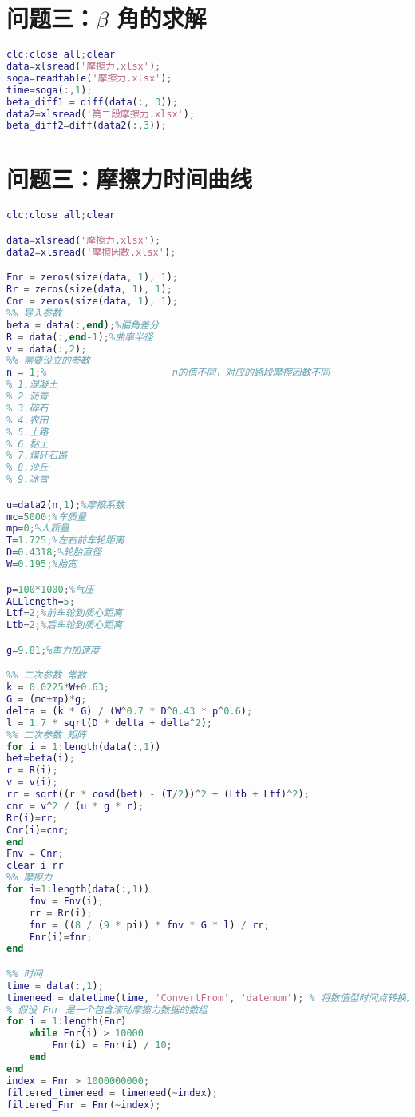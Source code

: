 \documentclass[withoutpreface,bwprint]{cumcmthesis} %
\begin{document}
\begin{appendices}
\begin{lstlisting}[language=matlab]
 \end{lstlisting}
  \section{问题三：$\beta$ 角的求解}
\begin{lstlisting}[language=matlab]
clc;close all;clear
data=xlsread('摩擦力.xlsx');
soga=readtable('摩擦力.xlsx');
time=soga(:,1);
beta_diff1 = diff(data(:, 3));
data2=xlsread('第二段摩擦力.xlsx');
beta_diff2=diff(data2(:,3));

 \end{lstlisting}

   \section{问题三：摩擦力时间曲线}
\begin{lstlisting}[language=matlab]
clc;close all;clear

data=xlsread('摩擦力.xlsx');
data2=xlsread('摩擦因数.xlsx');

Fnr = zeros(size(data, 1), 1);
Rr = zeros(size(data, 1), 1);
Cnr = zeros(size(data, 1), 1);
%% 导入参数
beta = data(:,end);%偏角差分
R = data(:,end-1);%曲率半径
v = data(:,2);
%% 需要设立的参数
n = 1;%                      n的值不同，对应的路段摩擦因数不同
% 1.混凝土
% 2.沥青
% 3.碎石
% 4.农田
% 5.土路
% 6.黏土
% 7.煤矸石路
% 8.沙丘
% 9.冰雪

u=data2(n,1);%摩擦系数
mc=5000;%车质量
mp=0;%人质量
T=1.725;%左右前车轮距离
D=0.4318;%轮胎直径
W=0.195;%胎宽

p=100*1000;%气压
ALLlength=5;
Ltf=2;%前车轮到质心距离
Ltb=2;%后车轮到质心距离

g=9.81;%重力加速度

%% 二次参数 常数
k = 0.0225*W+0.63;
G = (mc+mp)*g;
delta = (k * G) / (W^0.7 * D^0.43 * p^0.6);
l = 1.7 * sqrt(D * delta + delta^2);
%% 二次参数 矩阵
for i = 1:length(data(:,1))
bet=beta(i);
r = R(i);
v = v(i);
rr = sqrt((r * cosd(bet) - (T/2))^2 + (Ltb + Ltf)^2);
cnr = v^2 / (u * g * r);
Rr(i)=rr;
Cnr(i)=cnr;
end
Fnv = Cnr;
clear i rr
%% 摩擦力
for i=1:length(data(:,1))
    fnv = Fnv(i);
    rr = Rr(i);
    fnr = ((8 / (9 * pi)) * fnv * G * l) / rr;
    Fnr(i)=fnr;
end

%% 时间
time = data(:,1);
timeneed = datetime(time, 'ConvertFrom', 'datenum'); % 将数值型时间点转换为 datetime 格式
% 假设 Fnr 是一个包含滚动摩擦力数据的数组
for i = 1:length(Fnr)
    while Fnr(i) > 10000
        Fnr(i) = Fnr(i) / 10;
    end
end
index = Fnr > 1000000000;
filtered_timeneed = timeneed(~index);
filtered_Fnr = Fnr(~index);


\end{lstlisting}
\end{appendices}
\end{document}
